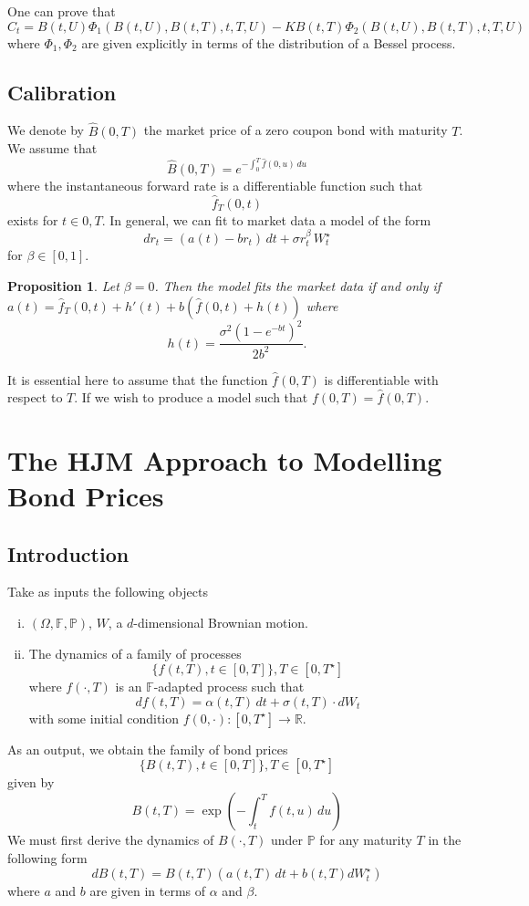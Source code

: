 \documentclass[10pt, oneside, reqno]{amsbook}
\theoremstyle{plain}%
\newtheorem{prop}[thm]{Proposition}
\theoremstyle{definition}
\theoremstyle{remark}
\newcommand{\R}{\mathbb{R}}
\renewcommand{\P}{\mathbb{P}}
\newcommand{\F}{\mathbb{F}}
\numberwithin{equation}{chapter}
\begin{document}
One can prove that \[
    C_t = B(t, U) \Phi_1(B(t, U), B(t, T), t, T, U) - K B(t, T) \Phi_2(B(t, U), B(t, T), t, T, U)
\] where $\Phi_1, \Phi_2$ are given explicitly in terms of the distribution of a Bessel process.

\section{Calibration} %
\label{sub:calibration}

We denote by $\hat B(0, T)$ the market price of a zero coupon bond with maturity $T$.  We assume that \[
    \hat B(0, T) = e^{- \int_0^T \hat f(0, u) \, du}
\] where the instantaneous forward rate  is a differentiable function such that \[
    \hat f_T(0, t) 
\] exists for $t \in 0, T$.  In general, we can fit to market data a model of the form \[
    dr_t = (a(t) - br_t) \, dt + \sigma r_t^\beta \, W^\star_t
\] for $\beta \in [0, 1]$.  

\begin{prop}
    Let $\beta = 0$. Then the model fits the market data if and only if $a(t) = \hat f_T(0, t) + h'(t) + b(\hat f(0, t) + h(t))$ where \[
        h(t) = \frac{\sigma^2\left(1-e^{-bt}\right)^2}{2b^2}.
    \]
\end{prop}
It is essential here to assume that the function $\hat f(0, T)$ is differentiable with respect to $T$.  If we wish to produce a model such that $f(0, T) = \hat f(0, T)$.


\chapter{The HJM Approach to Modelling Bond Prices} %
\label{cha:the_hjm_approach_to_modelling_bond_prices}

\section{Introduction} %
\label{sec:introduction_to_hjm}

Take as inputs the following objects \begin{enumerate}[(i)]
    \item $(\Omega, \F, \P)$, $W$, a $d$-dimensional Brownian motion.
    \item The dynamics of a family of processes \[
        \{ f(t, T), t \in [0, T] \}, T \in [0, T^\star]
    \] where $f(\cdot, T)$ is an $\F$-adapted process such that \[
        df(t, T) = \alpha(t, T) \, dt + \sigma(t, T) \cdot dW_t
    \] with some initial condition $f(0, \cdot) : [0, T^\star] \rightarrow \R$.  
\end{enumerate} As an output, we obtain the family of bond prices \[
    \{ B(t, T), t \in [0, T] \}, T \in [0, T^\star]
\] given by \[
    B(t, T) = \exp \left(-\int_t^T f(t, u) \, du \right)
\]  We must first derive the dynamics of $B(\cdot, T)$ under $\P$ for any maturity $T$ in the following form \[
    dB(t, T) = B(t, T) \left( a(t, T) \, dt + b(t, T) dW^\star_t \right)
\] where $a$ and $b$ are given in terms of $\alpha$ and $\beta$.  
\end{document}
